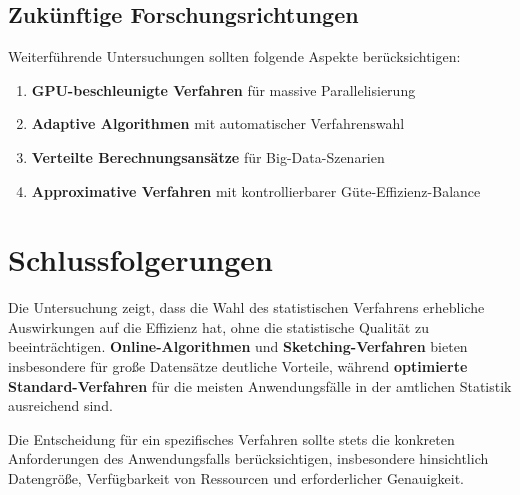 \documentclass[
  ngerman,
  10pt,
  letterpaper,
]{book}
\providecommand{\tightlist}{%
  \setlength{\itemsep}{0pt}\setlength{\parskip}{0pt}}
\begin{document}
\subsection{Zukünftige
Forschungsrichtungen}\label{zukuxfcnftige-forschungsrichtungen}

Weiterführende Untersuchungen sollten folgende Aspekte berücksichtigen:

\begin{enumerate}
\def\labelenumi{\arabic{enumi}.}
\tightlist
\item
  \textbf{GPU-beschleunigte Verfahren} für massive Parallelisierung
\item
  \textbf{Adaptive Algorithmen} mit automatischer Verfahrenswahl
\item
  \textbf{Verteilte Berechnungsansätze} für Big-Data-Szenarien
\item
  \textbf{Approximative Verfahren} mit kontrollierbarer
  Güte-Effizienz-Balance
\end{enumerate}

\section{Schlussfolgerungen}\label{schlussfolgerungen}

Die Untersuchung zeigt, dass die Wahl des statistischen Verfahrens
erhebliche Auswirkungen auf die Effizienz hat, ohne die statistische
Qualität zu beeinträchtigen. \textbf{Online-Algorithmen} und
\textbf{Sketching-Verfahren} bieten insbesondere für große Datensätze
deutliche Vorteile, während \textbf{optimierte Standard-Verfahren} für
die meisten Anwendungsfälle in der amtlichen Statistik ausreichend sind.

Die Entscheidung für ein spezifisches Verfahren sollte stets die
konkreten Anforderungen des Anwendungsfalls berücksichtigen,
insbesondere hinsichtlich Datengröße, Verfügbarkeit von Ressourcen und
erforderlicher Genauigkeit.


\backmatter
\printbibliography
\end{document}

